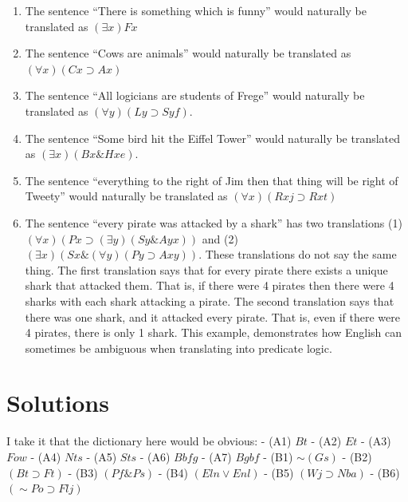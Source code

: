 \documentclass[
]{book}
\providecommand{\tightlist}{%
  \setlength{\itemsep}{0pt}\setlength{\parskip}{0pt}}
\begin{document}
\begin{enumerate}
\def\labelenumi{\arabic{enumi}.}
\tightlist
\item
  The sentence ``There is something which is funny'' would naturally be translated as \((\exists x) Fx\)
\item
  The sentence ``Cows are animals'' would naturally be translated as \((\forall x)(Cx \supset Ax)\)
\item
  The sentence ``All logicians are students of Frege'' would naturally be translated as \((\forall y)(Ly \supset Syf)\).
\item
  The sentence ``Some bird hit the Eiffel Tower'' would naturally be translated as \((\exists x) (Bx \& Hxe)\).
\item
  The sentence ``everything to the right of Jim then that thing will be right of Tweety'' would naturally be translated as \((\forall x)(Rxj \supset Rxt)\)
\item
  The sentence ``every pirate was attacked by a shark'' has two translations (1) \((\forall x) (Px \supset (\exists y)(Sy \& Ayx))\) and (2)\((\exists x)(Sx \& (\forall y)(Py \supset Axy))\). These translations do not say the same thing. The first translation says that for every pirate there exists a unique shark that attacked them. That is, if there were 4 pirates then there were 4 sharks with each shark attacking a pirate. The second translation says that there was one shark, and it attacked every pirate. That is, even if there were 4 pirates, there is only 1 shark. This example, demonstrates how English can sometimes be ambiguous when translating into predicate logic.
\end{enumerate}

\hypertarget{solutions-2}{%
\section{Solutions}\label{solutions-2}}

I take it that the dictionary here would be obvious:
- (A1) \(Bt\)
- (A2) \(Et\)
- (A3) \(Fow\)
- (A4) \(Nts\)
- (A5) \(Sts\)
- (A6) \(Bbfg\)
- (A7) \(Bgbf\)
- (B1) \(\sim(Gs)\)
- (B2) \((Bt \supset Ft)\)
- (B3) \((Pf \& Ps)\)
- (B4) \((Eln \lor Enl)\)
- (B5) \((Wj \supset Nba)\)
- (B6) \((\sim Po \supset Flj)\)

  
\end{document}
